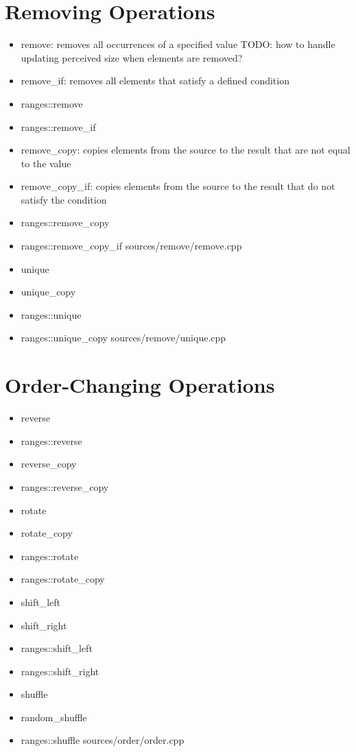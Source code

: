 \documentclass{article}
\begin{document}
\section{Removing Operations}
    \begin{itemize}
      \item remove: removes all occurrences of a specified value TODO: how to handle updating perceived size when elements are removed?
      \item remove\_if: removes all elements that satisfy a defined condition
      \item ranges::remove
      \item ranges::remove\_if
      \item remove\_copy: copies elements from the source to the result that are not equal to the value
      \item remove\_copy\_if: copies elements from the source to the result that do not satisfy the condition
      \item ranges::remove\_copy
      \item ranges::remove\_copy\_if
         {sources/remove/remove.cpp}
      \item unique
      \item unique\_copy
      \item ranges::unique
      \item ranges::unique\_copy
         {sources/remove/unique.cpp}
    \end{itemize}
\section{Order-Changing Operations}
    \begin{itemize}
      \item reverse
      \item ranges::reverse
      \item reverse\_copy
      \item ranges::reverse\_copy
      \item rotate
      \item rotate\_copy
      \item ranges::rotate
      \item ranges::rotate\_copy
      \item shift\_left
      \item shift\_right
      \item ranges::shift\_left
      \item ranges::shift\_right
      \item shuffle
      \item random\_shuffle
      \item ranges::shuffle
         {sources/order/order.cpp}
    \end{itemize}
\end{document}
